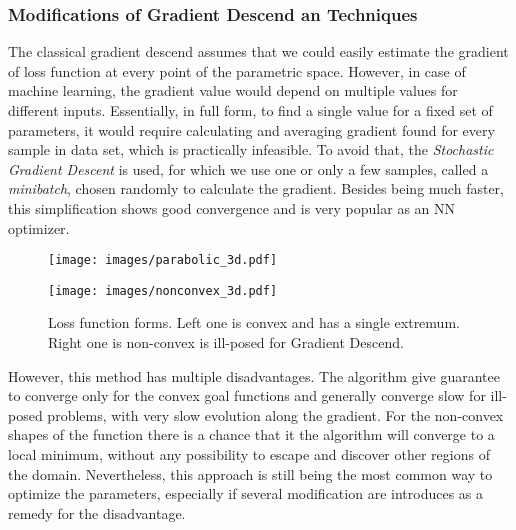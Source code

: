 \subsubsection{Modifications of Gradient Descend an Techniques}

The classical gradient descend assumes that we could easily estimate the gradient of loss function at every point of the parametric space.
However, in case of machine learning, the gradient value would depend on multiple values for different inputs.
Essentially, in full form, to find a single value for a fixed set of parameters, it would require calculating and averaging gradient found for every sample in data set, which is practically infeasible.
To avoid that, the \emph{Stochastic Gradient Descent} is used, for which we use one or only a few samples, called a \emph{minibatch}, chosen randomly to calculate the gradient.
Besides being much faster, this simplification shows good convergence and is very popular as an NN optimizer\cite{}.

\begin{figure*}[ht]
	\begin{multicols}{2}
		\texttt{[image: images/parabolic\_3d.pdf]}\par
		\texttt{[image: images/nonconvex\_3d.pdf]}\par
	\end{multicols}
	\caption{Loss function forms. Left one is convex and has a single extremum. Right one is non-convex is ill-posed for Gradient Descend. }
	\label{fig:lossfunc_demo}
\end{figure*}

However, this method has multiple disadvantages.
The algorithm give guarantee to converge only for the convex goal functions and generally converge slow for ill-posed problems, with very slow evolution along the gradient.
For the non-convex shapes of the function there is a chance that it the algorithm will converge to a local minimum, without any possibility to escape and discover other regions of the domain.
Nevertheless, this approach is still being the most common way to optimize the parameters, especially if several modification are introduces as a remedy for the disadvantage.
\medskip

